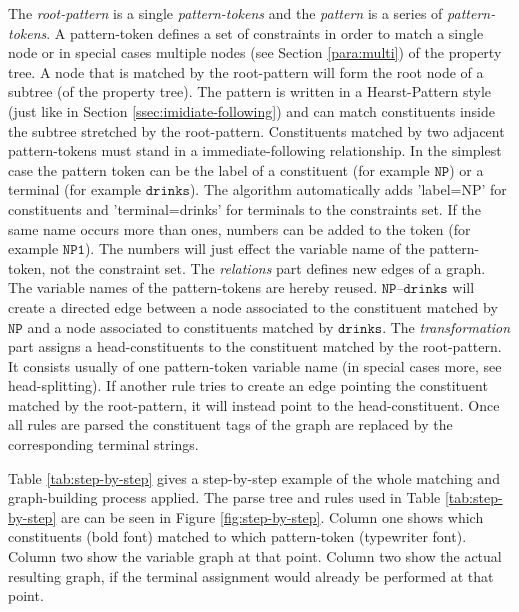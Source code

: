 \documentclass[english]{article}
\begin{document}
The \textit{root-pattern} is a single \textit{pattern-tokens} and the \textit{pattern} is a series of \textit{pattern-tokens}. A pattern-token defines a set of constraints in order to match a single node or in special cases multiple nodes (see Section \ref{para:multi}) of the property tree.
A node that is matched by the root-pattern will form the root node of a subtree (of the property tree). The pattern is written in a Hearst-Pattern style (just like in Section \ref{ssec:imidiate-following}) and can match constituents inside the subtree stretched by the root-pattern. Constituents matched by two adjacent pattern-tokens must stand in a immediate-following relationship. In the simplest case the pattern token can  be the label of a constituent (for example $\mathtt{NP}$) or a terminal (for example $\mathtt{drinks}$). The algorithm automatically adds 'label=NP' for constituents and 'terminal=drinks' for terminals to the constraints set. If the same name occurs more than ones, numbers can be added to the token (for example $\mathtt{NP1}$). The numbers will just effect the variable name of the pattern-token, not the constraint set.  
The \textit{relations} part defines new edges of a graph. The variable names of the pattern-tokens are hereby reused. $\mathtt{NP\text{--}drinks}$ will create a directed edge between a node associated to the constituent matched by $\mathtt{NP}$ and a node associated to constituents matched by $\mathtt{drinks}$.
The \textit{transformation} part assigns a head-constituents to the constituent matched by the root-pattern. It consists usually of one pattern-token variable name (in special cases more, see head-splitting). If another rule tries to create an edge pointing the constituent matched by the root-pattern, it will instead point to the head-constituent.
Once all rules are parsed the constituent tags of the graph are replaced by the corresponding terminal strings.

Table \ref{tab:step-by-step} gives a step-by-step example of the whole matching and graph-building process applied. The parse tree and rules used in Table \ref{tab:step-by-step} are can be seen in Figure \ref{fig:step-by-step}. Column one shows which constituents (bold font) matched to which pattern-token (typewriter font). Column two show the variable graph at that point. Column two show the actual resulting graph, if the terminal assignment would already be performed at that point.
\end{document}

